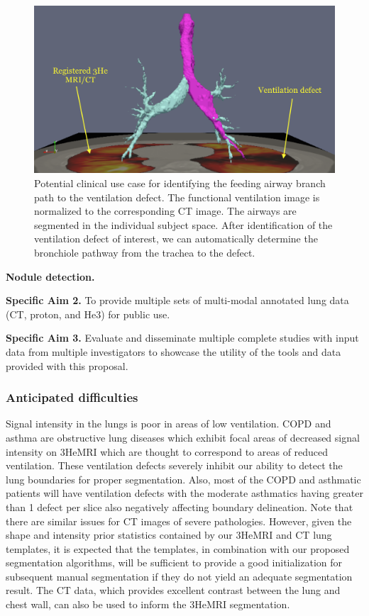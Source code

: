 \documentclass[11pt,]{article}
\begin{document}
\begin{figure}[htbp]
\centering
\includegraphics{Figs/airways.png}
\caption{Potential clinical use case for identifying the feeding airway
branch path to the ventilation defect. The functional ventilation image
is normalized to the corresponding CT image. The airways are segmented
in the individual subject space. After identification of the ventilation
defect of interest, we can automatically determine the bronchiole
pathway from the trachea to the defect.}
\end{figure}

\textbf{Nodule detection.}

\textbf{Specific Aim 2.} To provide multiple sets of multi-modal
annotated lung data (CT, proton, and He3) for public use.

\textbf{Specific Aim 3.} Evaluate and disseminate multiple complete
studies with input data from multiple investigators to showcase the
utility of the tools and data provided with this proposal.

\subsubsection{Anticipated difficulties}\label{anticipated-difficulties}

Signal intensity in the lungs is poor in areas of low ventilation. COPD
and asthma are obstructive lung diseases which exhibit focal areas of
decreased signal intensity on 3HeMRI which are thought to correspond to
areas of reduced ventilation. These ventilation defects severely inhibit
our ability to detect the lung boundaries for proper segmentation. Also,
most of the COPD and asthmatic patients will have ventilation defects
with the moderate asthmatics having greater than 1 defect per slice also
negatively affecting boundary delineation. Note that there are similar
issues for CT images of severe pathologies. However, given the shape and
intensity prior statistics contained by our 3HeMRI and CT lung
templates, it is expected that the templates, in combination with our
proposed segmentation algorithms, will be sufficient to provide a good
initialization for subsequent manual segmentation if they do not yield
an adequate segmentation result. The CT data, which provides excellent
contrast between the lung and chest wall, can also be used to inform the
3HeMRI segmentation.
\end{document}
